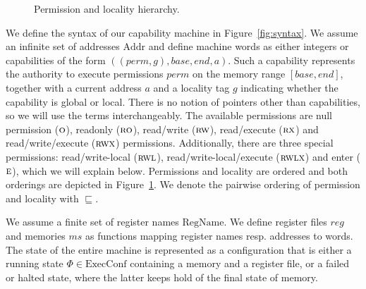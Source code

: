 \documentclass[format=acmsmall, review=true, screen=true]{acmart}
\renewcommand{\figurename}{Figure}
\newcommand\lau[1]{{\color{purple} \sf \footnotesize {LS: #1}}\\}
\renewcommand\lau[1]{}
\newcommand{\var}[1]{\mathit{#1}}
\newcommand{\hs}{\var{ms}}
\newcommand{\ms}{\hs}
\newcommand{\gl}{\var{g}}
\newcommand{\addr}{\var{a}}
\newcommand{\reg}{\var{reg}}
\newcommand{\perm}{\var{perm}}
\newcommand{\plaindom}[1]{\mathrm{#1}}
\newcommand{\Addrs}{\plaindom{Addr}}
\newcommand{\ExecConfs}{\plaindom{ExecConf}}
\newcommand{\RegName}{\plaindom{RegName}}
\newcommand{\plainperm}[1]{\textsc{#1}}
\newcommand{\noperm}{\plainperm{o}}
\newcommand{\readonly}{\plainperm{ro}}
\newcommand{\readwrite}{\plainperm{rw}}
\newcommand{\exec}{\plainperm{rx}}
\newcommand{\entry}{\plainperm{e}}
\newcommand{\rwx}{\plainperm{rwx}}
\newcommand{\readwritel}{\plainperm{rwl}}
\newcommand{\rwlx}{\plainperm{rwlx}}
\newcommand{\plainlocality}[1]{\mathrm{#1}}
\newcommand{\local}{\plainlocality{local}}
\newcommand{\glob}{\plainlocality{global}}
\newcommand{\itoplas}[1]{#1}
\begin{document}
\begin{figure}
  \centering
  \caption{Permission and locality hierarchy.}
  \label{fig:perm-hier}
\end{figure}

We define the syntax of our capability machine in \figurename~\ref{fig:syntax}.
We assume an infinite set of addresses $\Addrs$ and define machine words as
either integers or capabilities of the form
$((\perm,\gl),\var{base},\var{end},\addr)$. Such a capability represents the
authority to execute permissions $\perm$ on the memory range
$[\var{base},\var{end}]$, together with a current address $\addr$ and a locality tag
$\gl$ indicating whether the capability is global or local. There is no notion
of pointers other than capabilities, so we will use the terms interchangeably.
The available permissions are null permission
($\noperm$), readonly ($\readonly$), read/write ($\readwrite$), read/execute
($\exec$) and read/write/execute ($\rwx$) permissions. Additionally, there are
three special permissions: read/write-local ($\readwritel$), read/write-local/execute
($\rwlx$) and enter ($\entry$), which we will explain below.
\itoplas{Permissions and locality are ordered and both orderings are depicted in \figurename~\ref{fig:perm-hier}. We denote the pairwise ordering of permission and locality with $\sqsubseteq$.}

We assume a finite set of register names $\RegName$. We define register files
$\reg$ and memories $\ms$ as functions mapping register names resp. addresses to
words. The state of the entire machine is represented as a configuration that is
either a running state $\Phi \in \ExecConfs$ containing a memory and a register file,
or a failed or halted state, where the latter keeps hold of the final state of
memory.
\end{document}
